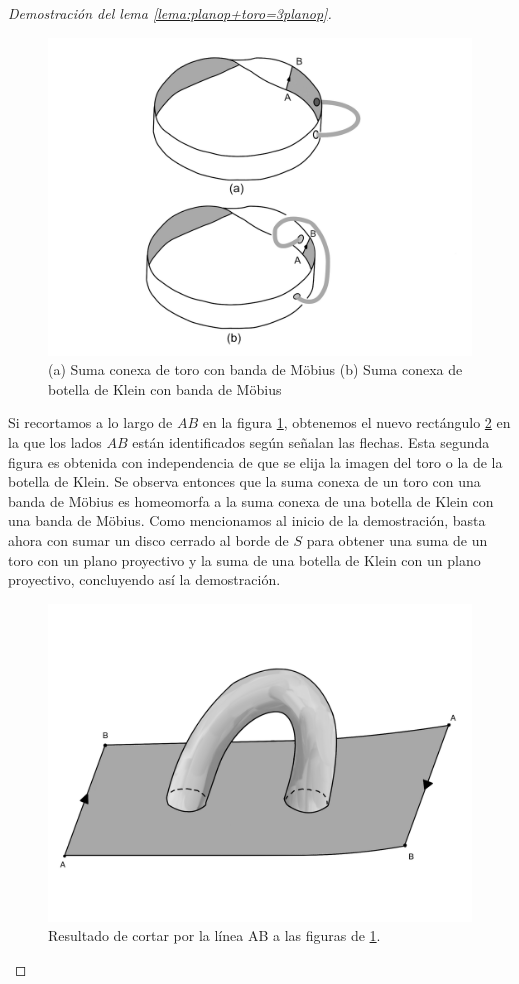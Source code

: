 \documentclass[a4paper,11pt,spanish, twoside, leqno]{tfg-uam}
\theoremstyle{definition}
\begin{document}
\begin{proof}[Demostración del lema \ref{lema:planop+toro=3planop}]
\begin{figure}[h!]
	\centering
	\includegraphics[width=0.5\linewidth]{imagenes/recorte2.png}
	\caption{(a) Suma conexa de toro con banda de M\"obius (b) Suma conexa de botella de Klein con banda de M\"obius}
    \label{recorte2}
\end{figure}

Si recortamos a lo largo de $AB$ en la figura \ref{recorte2}, obtenemos el nuevo rectángulo \ref{recorte3} en la que los lados $AB$ están identificados según señalan las flechas. Esta segunda figura es obtenida con independencia de que se elija la imagen del toro o la de la botella de Klein. Se observa entonces que la suma conexa de un toro con una banda de M\"obius es homeomorfa a la suma conexa de una botella de Klein con una banda de M\"obius. Como mencionamos al inicio de la demostración, basta ahora con sumar un disco cerrado al borde de $S$ para obtener una suma de un toro con un plano proyectivo y la suma de una botella de Klein con un plano proyectivo, concluyendo así la demostración.

\begin{figure}[h!]
	\centering
	\includegraphics[width=0.3\linewidth]{imagenes/recorte3.png}
	\caption{Resultado de cortar por la línea AB a las figuras de \ref{recorte2}.}
    \label{recorte3}
\end{figure}
\end{proof}
\end{document}
